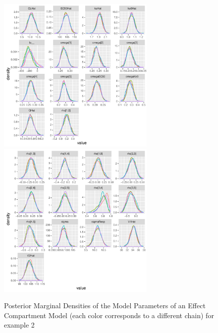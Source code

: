 \documentclass[11pt]{amsart}
\begin{document}
\begin{figure}[!htb]
\includegraphics[width=3.0in,trim=0in 0in 0 0in]{graphics/effCptModelTorsten_0.82/effCptPlots006.pdf}
\includegraphics[width=3.0in,trim=0in 0in 0 0in]{graphics/effCptModelTorsten_0.82/effCptPlots007.pdf}
\caption{{Posterior Marginal Densities of the Model Parameters of an Effect Compartment Model (each color corresponds to a different chain) for example 2}}
\label{effCptModelDens}
\end{figure}
\end{document}
